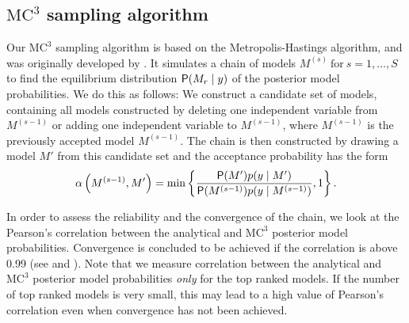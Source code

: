 \subsection[MC3 sampling algorithm]{$\mbox{MC}^3$ sampling algorithm}\label{sec:MC3_sampling}
Our $\mbox{MC}^3$ sampling algorithm is based on the Metropolis-Hastings
algorithm, and was originally developed by \cite{MadiganYork1995}. It
simulates a chain of models $M^{(s)} \ \text{for} \ s=1, \dots, S$ to
find the equilibrium distribution $\mathsf{P}(M_r \mid y)$ of the posterior
model probabilities. We do this as follows: We construct a candidate
set of models, containing all models constructed by deleting one
independent variable from $M^{(s-1)}$ or adding one independent
variable to $M^{(s-1)}$, where $M^{(s-1)}$ is the previously accepted
model $M^{(s-1)}$.  The chain is then constructed by drawing a
model $M'$ from this candidate set and the acceptance probability has the form
\begin{equation*}
	\alpha \left(M^{(s-1)}, M' \right)=\min \left\{\frac{\mathsf{P} (M')p(y \mid M')}{\mathsf{P} (M^{(s-1)})p(y \mid M^{(s-1)})}, 1 \right\}.
\end{equation*}

In order to assess the reliability and the convergence of the chain,
we look at the Pearson's correlation between the analytical and $\mbox{MC}^3$
posterior model probabilities.\label{misc:model_ranking} Convergence
is concluded to be achieved if the correlation is above 0.99 (see
\citealt{FernandezLeySteel2001b} and \citealt{Koop2003}). Note that we
measure correlation between the analytical and $\mbox{MC}^3$ posterior model
probabilities \textit{only} for the top ranked models. If the number
of top ranked models is very small, this may lead to a high value of
Pearson's correlation even when convergence has not been achieved. 
